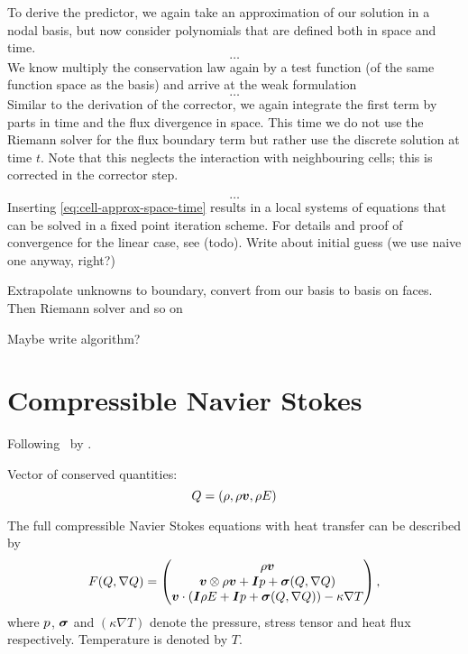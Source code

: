To derive the predictor, we again take an approximation of our solution in a nodal basis, but now consider polynomials that are defined both in space and time.
\begin{equation}
  \ldots
\end{equation}
We know multiply the conservation law again by a test function (of the same function space as the basis) and arrive at the weak formulation
\begin{equation}
  \label{eq:weak-pde-space-time}
 \ldots
\end{equation}
Similar to the derivation of the corrector, we again integrate the first term by parts in time and the flux divergence in space.
This time we do not use the Riemann solver for the flux boundary term but rather use the discrete solution at time $t$.
Note that this neglects the interaction with neighbouring cells; this is corrected in the corrector step.

\begin{equation}
  \label{eq:space-time-predictor}
  \ldots
\end{equation}
Inserting \cref{eq:cell-approx-space-time} results in a local systems of equations that can be solved in a fixed point iteration scheme.
For details and proof of convergence for the linear case, see (todo).
Write about initial guess (we use naive one anyway, right?)

Extrapolate unknowns to boundary, convert from our basis to basis on faces.
Then Riemann solver
and so on

Maybe write algorithm?



\section{Compressible Navier Stokes}
Following~\cite{dumbser2010arbitrary} by \citeauthor{dumbser2010arbitrary}.

Vector of conserved quantities:
\begin{equation}
  \label{eq:conserved-variables}
 Q = \left( \rho, \rho \bm{v}, \rho E \right) 
\end{equation}

The full compressible Navier Stokes equations with heat transfer can be described by
\begin{equation}
  F(Q, \nabla Q) = 
  \begin{pmatrix}
    \rho \bm{v} \\
    \bm{v}  \otimes \rho \bm{v} + \bm{I} p + \bm{\sigma} (Q, \nabla Q)  \\
    \bm{v} \cdot (\bm{I} \rho E + \bm{I} p + \bm{\sigma} (Q, \nabla Q)) - \kappa \nabla T
  \end{pmatrix},
\end{equation}
where $p$, $\bm{\sigma}$ and $(\kappa \nabla T)$ denote the pressure, stress tensor and heat flux respectively.
Temperature is denoted by $T$.

